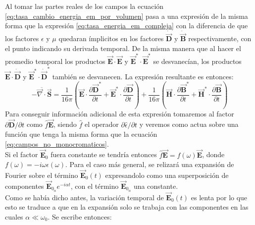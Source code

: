 \documentclass[../tesis_main_file.tex]{subfiles}
\begin{document}
Al tomar las partes reales de los campos la ecuación \ref{eq:tasa_cambio_energia_em_por_volumen} pasa a una expresión de la misma forma que la expresión \ref{eq:tasa_energia_em_compleja} con la diferencia de que los factores $\epsilon$ y $\mu$ quedaran ímplicitos en los factores $\dot{\overrightarrow{\textbf{D}}}$ y $\dot{\overrightarrow{\textbf{B}}}$ respectivamente, con el punto indicando su derivada temporal. De la misma manera que al hacer el promedio temporal los productos $\overrightarrow{\textbf{E}} \cdot \overrightarrow{\textbf{E}}$ y $\overrightarrow{\textbf{E}}^* \cdot \overrightarrow{\textbf{E}}^*$ se desvanecían, los productos $\overrightarrow{\textbf{E}} \cdot \dot{\overrightarrow{\textbf{D}}}$ y $\overrightarrow{\textbf{E}}^* \cdot \dot{\overrightarrow{\textbf{D}}}^*$ también se desvanecen. La expresión resultante es entonces:
\begin{equation}
\label{eq:promedio_temp_div_S_H_y_D}
\overline{-\overrightarrow{\nabla} \cdot \overrightarrow{\textbf{S}}} = \frac{1}{16\pi}\left(\overrightarrow{\textbf{E}}\cdot\frac{\partial\overrightarrow{\textbf{D}}^*}{\partial t} + \overrightarrow{\textbf{E}}^* \cdot \frac{\partial \overrightarrow{\textbf{D}}}{\partial t} \right) + \frac{1}{16\pi}\left(\overrightarrow{\textbf{H}}\cdot\frac{\partial\overrightarrow{\textbf{B}}^*}{\partial t} + \overrightarrow{\textbf{H}}^* \cdot \frac{\partial \overrightarrow{\textbf{B}}}{\partial t} \right)
\end{equation}
Para conseguir información adicional de esta expresión tomaremos al factor $\partial \overrightarrow{\textbf{D}}/\partial t$ como $\widehat{f}\overrightarrow{\textbf{E}}$, siendo $\widehat{f}$ el operador $\partial \widehat{\epsilon} / \partial t$ y veremos como actua sobre una función que tenga la misma forma que la ecuación \ref{eq:campos_no_monocromaticos}.\\
Si el factor $\overrightarrow{\textbf{E}}_0$ fuera constante se tendría entonces $\widehat{f}\overrightarrow{\textbf{E}}=f(\omega)\overrightarrow{\textbf{E}}$, donde $f(\omega) = -i\omega\epsilon(\omega)$. Para el caso más general, se relizará una expansión de Fourier sobre el término $\overrightarrow{\textbf{E}}_0(t)$ expresandolo como una superposición de componentes $\overrightarrow{\textbf{E}}_{0_\alpha}e^{-i\alpha t}$, con el término $\overrightarrow{\textbf{E}}_{0_\alpha}$ una constante.\\
Como se había dicho antes, la variación temporal de $\overrightarrow{\textbf{E}}_0(t)$ es lenta por lo que esto se traduce a que en la expansión solo se trabaja con las componentes en las cuales $\alpha \ll  \omega_0$. Se escribe entonces:
\end{document}
